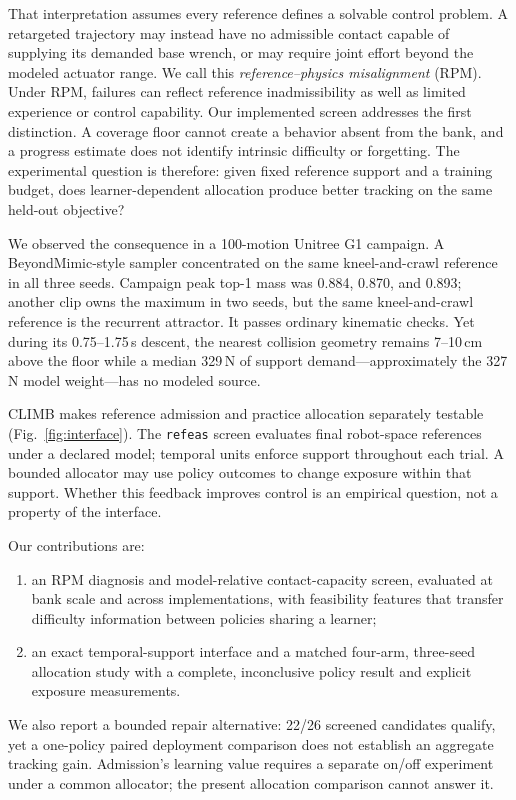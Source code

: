 \documentclass[letterpaper,10pt,conference]{ieeeconf}
\newcommand{\method}{CLIMB}
\begin{document}
That interpretation assumes every reference defines a solvable control problem. A retargeted
trajectory may instead have no admissible contact capable of supplying its demanded base wrench,
or may require joint effort beyond the modeled actuator range. We call this
\emph{reference--physics misalignment} (RPM). Under RPM, failures can reflect reference inadmissibility as well as limited
experience or control capability. Our implemented screen addresses the first distinction.
A coverage floor cannot create a behavior absent from the bank, and a progress estimate
does not identify intrinsic difficulty or forgetting. The experimental question is therefore:
given fixed reference support and a training budget, does learner-dependent allocation
produce better tracking on the same held-out objective?



We observed the consequence in a 100-motion Unitree G1 campaign. A BeyondMimic-style sampler
concentrated on the same kneel-and-crawl reference in all three seeds. Campaign peak top-1 mass was
0.884, 0.870, and 0.893; another clip owns the maximum in two seeds, but the same kneel-and-crawl
reference is the recurrent attractor. It passes ordinary kinematic checks. Yet during its
0.75--1.75\,s descent, the nearest collision geometry remains 7--10\,cm above the floor while a
median 329\,N of support demand---approximately the 327\,N model weight---has no modeled source.

\method{} makes reference admission and practice allocation separately testable
(Fig.~\ref{fig:interface}). The \texttt{refeas} screen evaluates final robot-space references
under a declared model; temporal units enforce support throughout each trial. A bounded
allocator may use policy outcomes to change exposure within that support. Whether this
feedback improves control is an empirical question, not a property of the interface.

Our contributions are:
\begin{enumerate}
  \item an RPM diagnosis and model-relative contact-capacity screen, evaluated at bank
  scale and across implementations, with feasibility features that transfer difficulty
  information between policies sharing a learner;
  \item an exact temporal-support interface and a matched four-arm, three-seed allocation
  study with a complete, inconclusive policy result and explicit exposure measurements.
\end{enumerate}
We also report a bounded repair alternative: 22/26 screened candidates qualify, yet a
one-policy paired deployment comparison does not establish an aggregate tracking gain.
Admission's learning value requires a separate on/off experiment under a common allocator;
the present allocation comparison cannot answer it.
\end{document}
